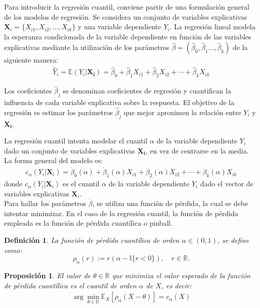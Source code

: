 \documentclass[11pt]{book}
\theoremstyle{plain} %
\newtheorem{proposition}{Proposición}
\newtheorem{definition}{Definición}
\theoremstyle{definition} %
\begin{document}
Para introducir la regresión cuantil, conviene partir de una formulación general 
de los modelos de regresión. Se considera un conjunto de variables 
explicativas $ \mathbf{X}_i = \{X_{i1}, X_{i2}, \dots, X_{ik} \}$ y una variable 
dependiente $Y_i$. La regresión lineal modela la esperanza condicionada 
de la variable dependiente en función de las variables explicativas mediante la 
utilización de los parámetros 
$\hat{\beta} = (\hat{\beta}_0, \hat{\beta}_1 \dots  , \hat{\beta}_k)$ de la siguiente 
manera:
\begin{align*}
    \hat{Y}_i= \mathbb{E}(Y_i | \mathbf{X_i}) = \hat{\beta}_0 + \hat{\beta}_1 X_{i1} + \hat{\beta}_2 X_{i2} + \cdots + \hat{\beta}_k X_{ik}
\end{align*}

 Los coeficientes $\hat{\beta}_j$ se denominan coeficientes de regresión 
y cuantifican la influencia de cada variable explicativa sobre la respuesta.
El objetivo de la regresión es estimar los parámetros $\hat{\beta}_j$ que mejor 
aproximen la relación entre $Y_i$ y $\mathbf{X_i}$. 

La regresión cuantil intenta modelar el cuantil $\alpha$ de la 
variable dependiente $Y_i$ dado un conjunto de variables explicativas 
$\mathbf{X_i}$, en vez de centrarse en la media. La forma general del modelo es:
\begin{align*}
    c_{\alpha}(Y_i|\mathbf{X}_i) = \dot{\beta}_0(\alpha)+ \dot{\beta}_1(\alpha)X_{i1}+ \dot{\beta}_2(\alpha)X_{i2}+\cdots +  \dot{\beta}_k(\alpha)X_{ik}
\end{align*}
donde $c_{\alpha}(Y_i|\mathbf{X}_i)$ es el cuantil $\alpha$ de la 
variable dependiente $Y_i$ dado el vector de variables explicativas 
$\mathbf{X}_i$. \\

Para hallar los parámetros $\dot{\beta}$, se utiliza una función de pérdida, la 
cual se debe intentar minimizar. En el caso de la regresión cuantil, la función 
de pérdida empleada es la función de pérdida cuantílica o pinball. 
\begin{definition}
La función de pérdida cuantílica de orden $\alpha \in (0,1)$, se define como:
   \begin{equation}
   \rho_\alpha(r) := r(\alpha - \mathbb{I}\{r < 0\}), \quad r \in \mathbb{R}.
   \label{eq:pinball}
   \end{equation}
\end{definition}

\begin{proposition}
El valor de $\theta \in \mathbb{R}$ que minimiza el valor esperado de la función 
de pérdida cuantílica es el cuantil de orden $\alpha$ de $X$, es decir:
   \begin{align*}
      \arg\min_{\theta \in \mathbb{R}} \mathbb{E}_X[\rho_\alpha(X - \theta)] = c_\alpha(X)
   \end{align*}
\end{proposition}
\end{document}
